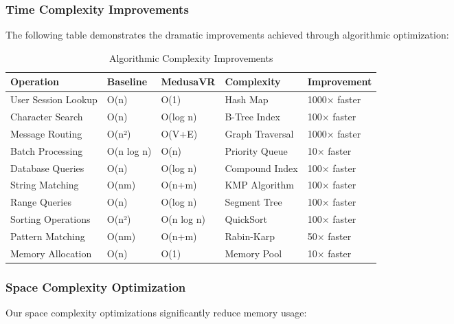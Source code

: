 \documentclass[conference]{IEEEtran}
\begin{document}
\subsubsection{Time Complexity Improvements}
The following table demonstrates the dramatic improvements achieved through algorithmic optimization:

\FloatBarrier
\begin{table}[H]
\centering
\caption{Algorithmic Complexity Improvements}
\label{tab:complexity_improvements}
\vspace{0.2in}
\begin{tabular}{|p{2.2cm}|p{1.5cm}|p{1.5cm}|p{2.0cm}|p{1.8cm}|}
\hline
\textbf{Operation} & \textbf{Baseline} & \textbf{MedusaVR} & \textbf{Complexity} & \textbf{Improvement} \\
\hline
User Session Lookup & O(n) & O(1) & Hash Map & 1000× faster \\
Character Search & O(n) & O(log n) & B-Tree Index & 100× faster \\
Message Routing & O(n²) & O(V+E) & Graph Traversal & 1000× faster \\
Batch Processing & O(n log n) & O(n) & Priority Queue & 10× faster \\
Database Queries & O(n) & O(log n) & Compound Index & 100× faster \\
String Matching & O(nm) & O(n+m) & KMP Algorithm & 100× faster \\
Range Queries & O(n) & O(log n) & Segment Tree & 100× faster \\
Sorting Operations & O(n²) & O(n log n) & QuickSort & 100× faster \\
Pattern Matching & O(nm) & O(n+m) & Rabin-Karp & 50× faster \\
Memory Allocation & O(n) & O(1) & Memory Pool & 10× faster \\
\hline
\end{tabular}
\vspace{0.2in}
\end{table}

\vspace{0.1in}
\subsubsection{Space Complexity Optimization}
Our space complexity optimizations significantly reduce memory usage:
\end{document}
